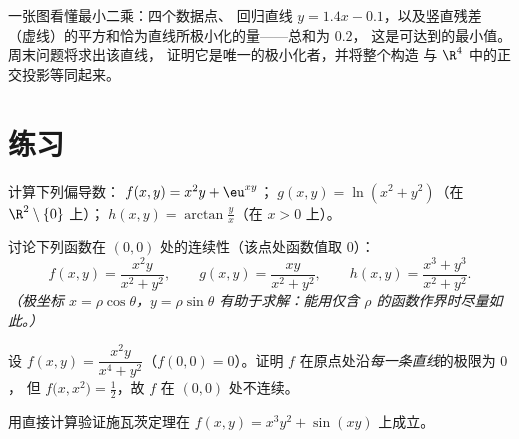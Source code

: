 \begin{omfigure}

{\small 一张图看懂最小二乘：四个数据点、
回归直线 $y = 1.4x - 0.1$，以及竖直残差
（虚线）的平方和恰为直线所极小化的量——总和为 $0.2$，
这是可达到的最小值。周末问题将求出该直线，
证明它是唯一的极小化者，并将整个构造
与 $\R^4$ 中的正交投影等同起来。}
\end{omfigure}

\section{练习}

\begin{exercise}[$\star$]\label{exo:b1:multivar:1}
计算下列偏导数：
$f(x,y) = x^2 y + \eu^{xy}$；$\;g(x,y) = \ln(x^2 + y^2)$（在
$\R^2\setminus\{0\}$ 上）；$\;h(x,y) = \arctan\frac yx$（在 $x > 0$ 上）。
\end{exercise}

\begin{exercise}[$\star$]\label{exo:b1:multivar:2}
讨论下列函数在 $(0,0)$ 处的连续性（该点处函数值取 $0$）：
\[
f(x,y) = \frac{x^2 y}{x^2 + y^2},
\qquad
g(x,y) = \frac{xy}{x^2 + y^2},
\qquad
h(x,y) = \frac{x^3 + y^3}{x^2 + y^2}.
\]
\emph{（极坐标 $x = \rho\cos\theta$，$y = \rho\sin\theta$
有助于求解：能用仅含 $\rho$ 的函数作界时尽量如此。）}
\end{exercise}

\begin{exercise}[$\star\star$]\label{exo:b1:multivar:3}
设 $f(x,y) = \dfrac{x^2 y}{x^4 + y^2}$（$f(0,0) = 0$）。证明
$f$ 在原点处沿\emph{每一条直线}的极限为 $0$，
但 $f\bigl(x, x^2\bigr) = \frac12$，故 $f$ 在
$(0,0)$ 处不连续。
\end{exercise}

\begin{exercise}[$\star$]\label{exo:b1:multivar:4}
用直接计算验证施瓦茨定理在 $f(x, y) = x^3 y^2 + \sin(xy)$ 上成立。
\end{exercise}

